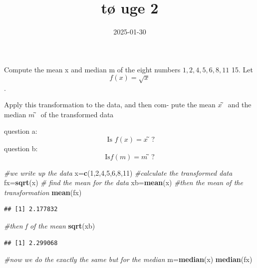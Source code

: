 \documentclass[
]{article}
\title{tø uge 2}
\author{}
\date{\vspace{-2.5em}2025-01-30}
\newenvironment{Shaded}{\begin{snugshade}}{\end{snugshade}}
\newcommand{\CommentTok}[1]{\textcolor[rgb]{0.56,0.35,0.01}{\textit{#1}}}
\newcommand{\DecValTok}[1]{\textcolor[rgb]{0.00,0.00,0.81}{#1}}
\newcommand{\FunctionTok}[1]{\textcolor[rgb]{0.13,0.29,0.53}{\textbf{#1}}}
\newcommand{\NormalTok}[1]{#1}
\newcommand{\OtherTok}[1]{\textcolor[rgb]{0.56,0.35,0.01}{#1}}
\begin{document}
\maketitle

Compute the mean x and median m of the eight numbers
\(1, 2, 4, 5, 6, 8, 11\) 15. Let \[f (x) = \sqrt{x}\].\newline

Apply this transformation to the data, and then com- pute the mean \(x̃\)
and the median \(m̃\) of the transformed data

question a: \[\text{ Is}\,\, f (x) = x̃?\]\newline question b:
\[\text{Is}  f ( m ) = m̃?\]

\begin{Shaded}
\begin{Highlighting}[]
\CommentTok{\#we write up the data }
\NormalTok{x}\OtherTok{=}\FunctionTok{c}\NormalTok{(}\DecValTok{1}\NormalTok{,}\DecValTok{2}\NormalTok{,}\DecValTok{4}\NormalTok{,}\DecValTok{5}\NormalTok{,}\DecValTok{6}\NormalTok{,}\DecValTok{8}\NormalTok{,}\DecValTok{11}\NormalTok{)}
\CommentTok{\#calculate the transformed data}
\NormalTok{fx}\OtherTok{=}\FunctionTok{sqrt}\NormalTok{(x)}
\CommentTok{\# find the mean for the data}
\NormalTok{xb}\OtherTok{=}\FunctionTok{mean}\NormalTok{(x)}
\CommentTok{\#then the mean of the transformation }
\FunctionTok{mean}\NormalTok{(fx)}
\end{Highlighting}
\end{Shaded}

\begin{verbatim}
## [1] 2.177832
\end{verbatim}

\begin{Shaded}
\begin{Highlighting}[]
\CommentTok{\#then f of the mean }
\FunctionTok{sqrt}\NormalTok{(xb)}
\end{Highlighting}
\end{Shaded}

\begin{verbatim}
## [1] 2.299068
\end{verbatim}

\begin{Shaded}
\begin{Highlighting}[]
\CommentTok{\#now we do the exactly the same but for the median }
\NormalTok{m}\OtherTok{=}\FunctionTok{median}\NormalTok{(x)}
\FunctionTok{median}\NormalTok{(fx)}
\end{Highlighting}
\end{Shaded}
\end{document}
